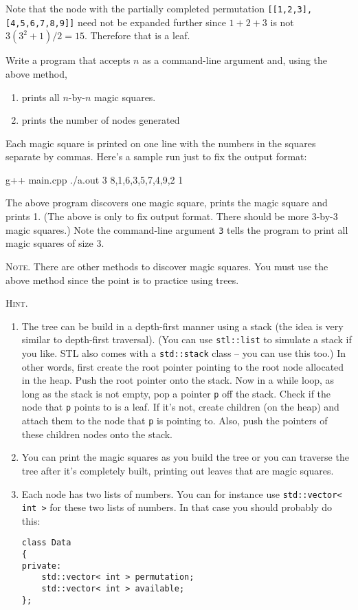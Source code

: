 Note that the node with the partially completed permutation
\verb![[1,2,3],[4,5,6,7,8,9]]!
need not be expanded further since $1 + 2 + 3$ is not
$3(3^2 + 1)/2 = 15$.
Therefore that is a leaf.


Write a program that accepts $n$ as a command-line argument and,
using the above method, 
\begin{enumerate}[nosep]
\item prints all $n$-by-$n$ magic squares.
\item prints the number of nodes generated 
\end{enumerate}
Each magic square is printed on one line with the numbers in the squares
separate by commas.
Here's a sample run just to fix the output format:
\begin{console}[commandchars=\\\{\}]
g++ main.cpp
./a.out 3
8,1,6,3,5,7,4,9,2
1
\end{console}
The above program discovers one magic square,
prints the magic square and prints 1.
(The above is only to fix output format. There should be more 3-by-3
magic squares.)
Note the command-line argument \texttt{3}
tells the program to print all magic squares of size 3.


\textsc{Note.}
There are other methods to discover magic squares.
You must use the above method since the point is to practice
using trees.

\textsc{Hint.}
\begin{enumerate}[nosep]
\item
  The tree can be build in a depth-first manner using a stack
  (the idea is very similar to depth-first traversal).
  (You can use \verb!stl::list! to simulate a stack if you like.
  STL also comes with a \verb!std::stack! class -- you can use this too.)
  In other words, first create the root pointer pointing to the root node
  allocated in the heap.
  Push the root pointer onto the stack.
  Now in a while loop, as long as the stack is not empty,
  pop a pointer \verb!p! off the stack.
  Check if the node that \verb!p! points to 
  is a leaf. 
  If it's not, create children (on the heap) and attach them to 
  the node that \verb!p! is pointing to.
  Also, push the pointers of these children nodes onto the stack.
\item
  You can print the magic squares as you build the tree 
  or you can traverse the tree after it's completely built,
  printing out leaves that are magic squares.
  
\item
  Each node has two lists of numbers.
  You can for instance use \verb!std::vector< int >! for these two lists of
  numbers.
  In that case you should probably do this:
\begin{Verbatim}[frame=single,fontsize=\footnotesize]
class Data
{
private:
    std::vector< int > permutation;
    std::vector< int > available;
};
\end{Verbatim}
\end{enumerate}



